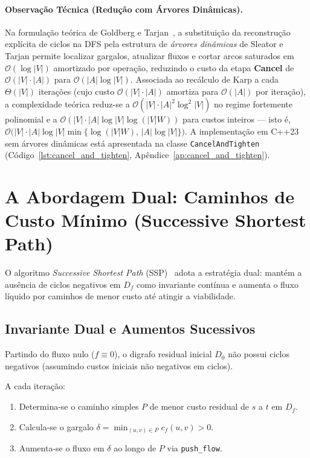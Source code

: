 \paragraph{Observação Técnica (Redução com Árvores Dinâmicas).}
Na formulação teórica de Goldberg e Tarjan~\cite{goldberg1989finding}, a substituição da reconstrução explícita de ciclos na DFS pela estrutura de \emph{árvores dinâmicas} de Sleator e Tarjan permite localizar gargalos, atualizar fluxos e cortar arcos saturados em $\mathcal{O}(\log |V|)$ amortizado por operação, reduzindo o custo da etapa \textbf{Cancel} de $\mathcal{O}(|V| \cdot |A|)$ para $\mathcal{O}(|A| \log |V|)$. Associada ao recálculo de Karp a cada $\Theta(|V|)$ iterações (cujo custo $\mathcal{O}(|V|\cdot|A|)$ amortiza para $\mathcal{O}(|A|)$ por iteração), a complexidade teórica reduz-se a $\mathcal{O}(|V| \cdot |A|^2 \log^2 |V|)$ no regime fortemente polinomial e a $\mathcal{O}(|V| \cdot |A| \log |V| \log(|V|W))$ para custos inteiros — isto é, $\mathcal{O}\bigl(|V| \cdot |A| \log |V| \min\{\log(|V|W),\, |A|\log |V|\}\bigr)$. A implementação em C++23 sem árvores dinâmicas está apresentada na classe \lstinline{CancelAndTighten} (Código~\ref{lst:cancel_and_tighten}, Apêndice~\ref{ap:cancel_and_tighten}).


\section{A Abordagem Dual: Caminhos de Custo Mínimo (Successive Shortest Path)}\label{sec:ssp}

O algoritmo \textit{Successive Shortest Path} (SSP)~\cite{ahuja1993network, schrijver2003combinatorial} adota a estratégia dual: mantém a ausência de ciclos negativos em $D_f$ como invariante contínua e aumenta o fluxo líquido por caminhos de menor custo até atingir a viabilidade.

\subsection{Invariante Dual e Aumentos Sucessivos}

Partindo do fluxo nulo ($f \equiv 0$), o digrafo residual inicial $D_0$ não possui ciclos negativos (assumindo custos iniciais não negativos em ciclos).

A cada iteração:
\begin{enumerate}
    \item Determina-se o caminho simples $P$ de menor custo residual de $s$ a $t$ em $D_f$.
    \item Calcula-se o gargalo $\delta = \min_{(u,v) \in P} c_f(u,v) > 0$.
    \item Aumenta-se o fluxo em $\delta$ ao longo de $P$ via \lstinline{push_flow}.
\end{enumerate}

